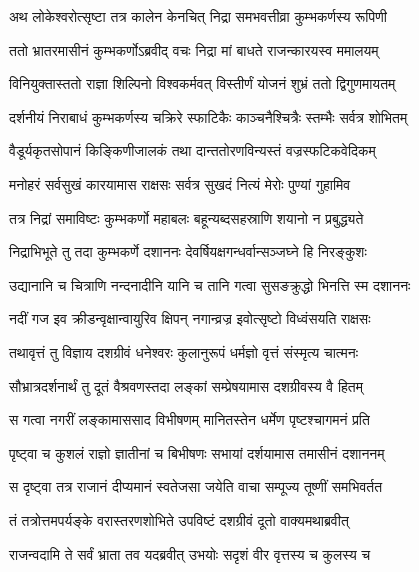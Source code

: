 
\twolineshloka
{अथ लोकेश्वरोत्सृष्टा तत्र कालेन केनचित्}
{निद्रा समभवत्तीव्रा कुम्भकर्णस्य रूपिणी} %

\twolineshloka
{ततो भ्रातरमासीनं कुम्भकर्णोऽब्रवीद् वचः}
{निद्रा मां बाधते राजन्कारयस्व ममालयम्} %

\twolineshloka
{विनियुक्तास्ततो राज्ञा शिल्पिनो विश्वकर्मवत्}
{विस्तीर्णं योजनं शुभ्रं ततो द्विगुणमायतम्} %

\twolineshloka
{दर्शनीयं निराबाधं कुम्भकर्णस्य चक्रिरे}
{स्फाटिकैः काञ्चनैश्चित्रैः स्तम्भैः सर्वत्र शोभितम्} %

\twolineshloka
{वैडूर्यकृतसोपानं किङ्किणीजालकं तथा}
{दान्ततोरणविन्यस्तं वज्रस्फटिकवेदिकम्} %

\twolineshloka
{मनोहरं सर्वसुखं कारयामास राक्षसः}
{सर्वत्र सुखदं नित्यं मेरोः पुण्यां गुहामिव} %

\twolineshloka
{तत्र निद्रां समाविष्टः कुम्भकर्णो महाबलः}
{बहून्यब्दसहस्राणि शयानो न प्रबुद्ध्यते} %

\twolineshloka
{निद्राभिभूते तु तदा कुम्भकर्णे दशाननः}
{देवर्षियक्षगन्धर्वान्सञ्जघ्ने हि निरङ्कुशः} %

\twolineshloka
{उद्यानानि च चित्राणि नन्दनादीनि यानि च}
{तानि गत्वा सुसङक्रुद्धो भिनत्ति स्म दशाननः} %

\twolineshloka
{नदीं गज इव क्रीडन्वृक्षान्वायुरिव क्षिपन्}
{नगान्व्रज्र इवोत्सृष्टो विध्वंसयति राक्षसः} %

\twolineshloka
{तथावृत्तं तु विज्ञाय दशग्रीवं धनेश्वरः}
{कुलानुरूपं धर्मज्ञो वृत्तं संस्मृत्य चात्मनः} %

\twolineshloka
{सौभ्रात्रदर्शनार्थं तु दूतं वैश्रवणस्तदा}
{लङ्कां सम्प्रेषयामास दशग्रीवस्य वै हितम्} %

\twolineshloka
{स गत्वा नगरीं लङ्कामाससाद विभीषणम्}
{मानितस्तेन धर्मेण पृष्टश्चागमनं प्रति} %

\twolineshloka
{पृष्ट्वा च कुशलं राज्ञो ज्ञातीनां च बिभीषणः}
{सभायां दर्शयामास तमासीनं दशाननम्} %

\twolineshloka
{स दृष्ट्वा तत्र राजानं दीप्यमानं स्वतेजसा}
{जयेति वाचा सम्पूज्य तूष्णीं समभिवर्तत} %

\twolineshloka
{तं तत्रोत्तमपर्यङ्के वरास्तरणशोभिते}
{उपविष्टं दशग्रीवं दूतो वाक्यमथाब्रवीत्} %

\twolineshloka
{राजन्वदामि ते सर्वं भ्राता तव यदब्रवीत्}
{उभयोः सदृशं वीर वृत्तस्य च कुलस्य च} %

